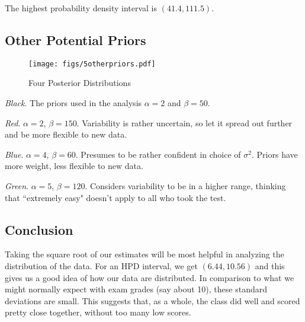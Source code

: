 \documentclass[12pt]{article}
\begin{document}
The highest probability density interval is $(41.4, 111.5)$.

\subsection{Other Potential Priors}

\begin{figure}[H]
\begin{center}
\texttt{[image: figs/5otherpriors.pdf]}
\caption{Four Posterior Distributions}
\end{center}
\end{figure}

\noindent \textit{Black}.  The priors used in the analysis $\alpha=2$ and $\beta=50$.

\noindent \textit{Red}. $\alpha=2$, $\beta=150$.  Variability is rather uncertain, so let it spread out further and be more flexible to new data.

\noindent \textit{Blue}. $\alpha=4$, $\beta=60$.  Presumes to be rather confident in choice of $\sigma^2$.  Priors have more weight, less flexible to new data.

\noindent \textit{Green}. $\alpha=5$, $\beta=120$.  Considers variability to be in a higher range, thinking that ``extremely easy" doesn't apply to all who took the test.

\subsection{Conclusion}

Taking the square root of our estimates will be most helpful in analyzing the distribution of the data.  For an HPD interval, we get $(6.44, 10.56)$ and this gives us a good idea of how our data are distributed.  In comparison to what we might normally expect with exam grades (say about 10), these standard deviations are small.  This suggests that, as a whole, the class did well and scored pretty close together, without too many low scores.
\end{document}
